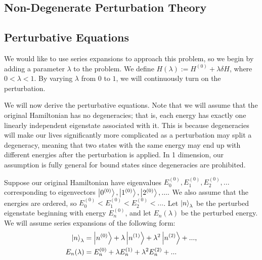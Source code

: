 \subsection{Non-Degenerate Perturbation Theory}
\subsection*{Perturbative Equations}
We would like to use series expansions to approach this problem, so we begin by adding a parameter $\lambda$ to the problem. We define $H(\lambda) := H^{(0)} + \lambda \delta H$, where $0<\lambda<1$. By varying $\lambda$ from $0$ to $1$, we will continuously turn on the perturbation.

We will now derive the perturbative equations. Note that we will assume that the original Hamiltonian has no degeneracies; that is, each energy has exactly one linearly independent eigenstate associated with it. This is because degeneracies will make our lives significantly more complicated as a perturbation may split a degeneracy, meaning that two states with the same energy may end up with different energies after the perturbation is applied. In 1 dimension, our assumption is fully general for bound states since degeneracies are prohibited.

Suppose our original Hamiltonian have eigenvalues $E_0^{(0)}, E_1^{(0)}, E_2^{(0)},...$ corresponding to eigenvectors $\left| 0^{(0)} \right\rangle, \left| 1^{(0)} \right\rangle,\left| 2^{(0)} \right\rangle,... .$ We also assume that the energies are ordered, so $E_0^{(0)} < E_1^{(0)} < E_2^{(0)} < ... $. Let $\left| n \right\rangle_\lambda$ be the perturbed eigenstate beginning with energy $E_n^{(0)}$, and let $E_n (\lambda)$ be the perturbed energy. We will assume series expansions of the following form:
\begin{align*}
\left| n \right\rangle_{\lambda} &= \left| n^{(0)} \right\rangle + \lambda \left| n^{(1)} \right\rangle +  \lambda^2 \left| n^{(2)} \right\rangle + ..., \\
E_n (\lambda) &= E_n^{(0)} + \lambda E_n^{(1)} + \lambda^2 E_n^{(2)} + ... 
\end{align*}


